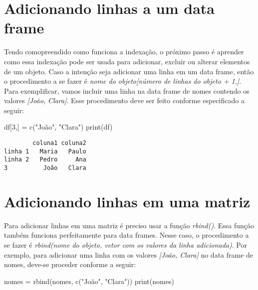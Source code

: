 \documentclass[
  letterpaper,
  DIV=11,
  numbers=noendperiod]{scrreprt}
\newenvironment{Shaded}{\begin{snugshade}}{\end{snugshade}}
\newcommand{\DecValTok}[1]{\textcolor[rgb]{0.68,0.00,0.00}{#1}}
\newcommand{\FunctionTok}[1]{\textcolor[rgb]{0.28,0.35,0.67}{#1}}
\newcommand{\NormalTok}[1]{\textcolor[rgb]{0.00,0.23,0.31}{#1}}
\newcommand{\OtherTok}[1]{\textcolor[rgb]{0.00,0.23,0.31}{#1}}
\newcommand{\StringTok}[1]{\textcolor[rgb]{0.13,0.47,0.30}{#1}}
\begin{document}
\section{Adicionando linhas a um data
frame}\label{adicionando-linhas-a-um-data-frame}

Tendo comopreendido como funciona a indexação, o próximo passo é
aprender como essa indexação pode ser usada para adicionar, excluir ou
alterar elementos de um objeto. Caso a intenção seja adicionar uma linha
em um data frame, então o procedimento a se fazer é \emph{nome do
objeto{[}número de linhas do objeto + 1,{]}}. Para exemplificar, vamos
incluir uma linha na data frame de nomes contendo os valores
\emph{{[}João, Clara{]}}. Esse procedimento deve ser feito conforme
especificado a seguir:

\begin{Shaded}
\begin{Highlighting}[]
\NormalTok{df[}\DecValTok{3}\NormalTok{,] }\OtherTok{=} \FunctionTok{c}\NormalTok{(}\StringTok{"João"}\NormalTok{, }\StringTok{"Clara"}\NormalTok{)}
\FunctionTok{print}\NormalTok{(df)}
\end{Highlighting}
\end{Shaded}

\begin{verbatim}
        coluna1 coluna2
linha 1   Maria   Paulo
linha 2   Pedro     Ana
3          João   Clara
\end{verbatim}

\section{Adicionando linhas em uma
matriz}\label{adicionando-linhas-em-uma-matriz}

Para adicionar linhas em uma matriz é preciso usar a função
\emph{rbind()}. Essa função também funciona perfeitamente para data
frames. Nesse caso, o procedimento a se fazer é \emph{rbind(nome do
objeto, vetor com os valores da linha adicionada)}. Por exemplo, para
adicionar uma linha com os valores \emph{{[}João, Clara{]}} no data
frame de nomes, deve-se proceder conforme a seguir:

\begin{Shaded}
\begin{Highlighting}[]
\NormalTok{nomes }\OtherTok{=} \FunctionTok{rbind}\NormalTok{(nomes, }\FunctionTok{c}\NormalTok{(}\StringTok{"João"}\NormalTok{, }\StringTok{"Clara"}\NormalTok{))}
\FunctionTok{print}\NormalTok{(nomes)}
\end{Highlighting}
\end{Shaded}
\end{document}
